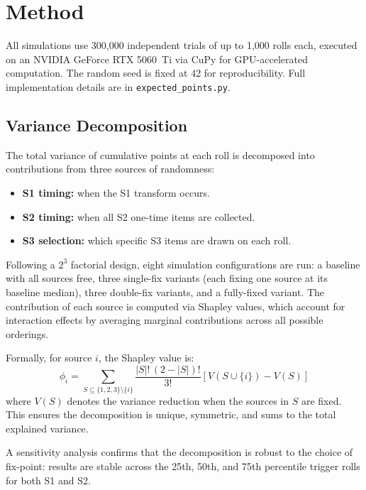 \documentclass[11pt, a4paper]{article}
\begin{document}
\section{Method}
\label{sec:method}

All simulations use 300{,}000 independent trials of up to 1{,}000
rolls each, executed on an NVIDIA GeForce RTX 5060~Ti via CuPy for
GPU-accelerated computation. The random seed is fixed at 42 for
reproducibility. Full implementation details are in
\texttt{expected\_points.py}.

\subsection{Variance Decomposition}
\label{sec:method-variance}

The total variance of cumulative points at each roll is decomposed
into contributions from three sources of randomness:

\begin{itemize}[nosep]
    \item \textbf{S1 timing:} when the S1 transform occurs.
    \item \textbf{S2 timing:} when all S2 one-time items are collected.
    \item \textbf{S3 selection:} which specific S3 items are drawn on
          each roll.
\end{itemize}

Following a $2^3$ factorial design, eight simulation configurations
are run: a baseline with all sources free, three single-fix variants
(each fixing one source at its baseline median), three double-fix
variants, and a fully-fixed variant. The contribution of each source
is computed via Shapley values, which account for interaction effects
by averaging marginal contributions across all possible orderings.

Formally, for source $i$, the Shapley value is:
\begin{equation}
    \phi_i = \sum_{S \subseteq \{1,2,3\} \setminus \{i\}}
    \frac{|S|!\,(2 - |S|)!}{3!}
    \left[ V(S \cup \{i\}) - V(S) \right]
\end{equation}
where $V(S)$ denotes the variance reduction when the sources in $S$
are fixed. This ensures the decomposition is unique, symmetric, and
sums to the total explained variance.

A sensitivity analysis confirms that the decomposition is robust to
the choice of fix-point: results are stable across the 25th, 50th,
and 75th percentile trigger rolls for both S1 and S2.
\end{document}
